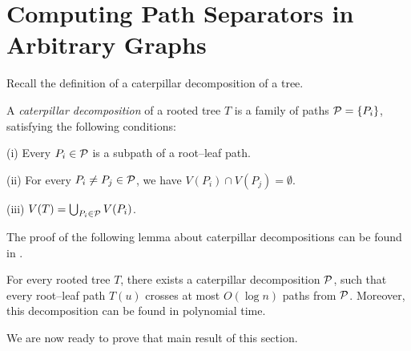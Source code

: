 \documentclass[envcountsect]{llncs}
\begin{document}
\section{Computing Path Separators in Arbitrary Graphs}
Recall the definition of a 
caterpillar decomposition of a tree.
\begin{definition}
A \emph{caterpillar decomposition}
of a rooted tree $T$ is a family of paths ${\cal P} = \{P_i\}$, satisfying the following conditions:
\begin{description}
\item{(i)}
Every $P_i\in {\cal P}$ is a subpath of a root--leaf path.
\item{(ii)}
For every $P_i\neq P_j\in {\cal P}$, we have $V(P_i)\cap V(P_j)=\emptyset$.
\item{(iii)}
$V(T) = \bigcup_{P_i\in {\cal P}} V(P_i)$.
\end{description}
\end{definition}
The proof of the following lemma about caterpillar decompositions can be found in \cite{matousek1999trees,charikar2002dimension}.

\begin{lemma}\label{lem:computing_caterpillar}
For every rooted tree $T$, there exists a caterpillar decomposition ${\cal P}$, such that every root--leaf path $T(u)$ crosses
at most $O(\log n)$ paths from $\cal P$.
Moreover, this decomposition can be found in polynomial time.
\end{lemma}

We are now ready to prove that main result of this section.
\end{document}
